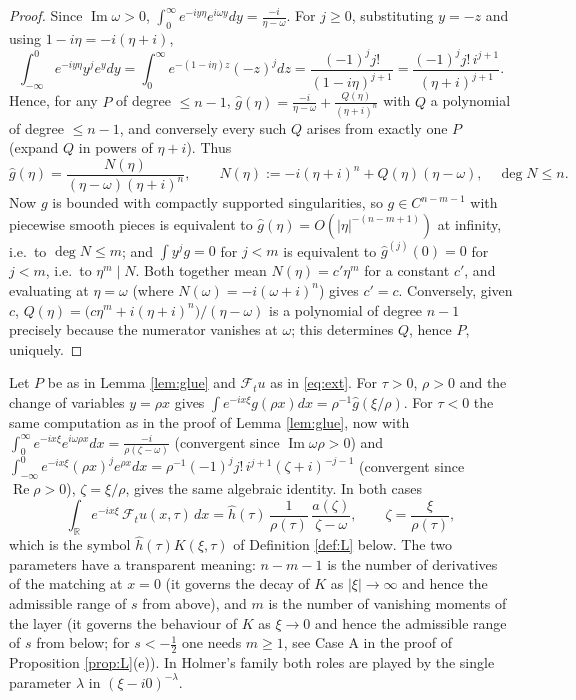\documentclass[10pt,reqno]{amsart}
\theoremstyle{remark}
\numberwithin{equation}{section}
\newcommand{\R}{\mathbb R}
\newcommand{\om}{\omega}
\newcommand{\la}{\lambda}
\newcommand{\re}{\operatorname{Re}}
\newcommand{\ima}{\operatorname{Im}}
\newcommand{\F}{\mathcal{F}}
\begin{document}
\begin{proof}
Since $\ima\om>0$, $\int_0^\infty e^{-iy\eta}e^{i\om y}dy=\frac{-i}{\eta-\om}$. For $j\ge0$, substituting $y=-z$ and using $1-i\eta=-i(\eta+i)$,
$$\int_{-\infty}^0e^{-iy\eta}y^je^{y}dy=\int_0^\infty e^{-(1-i\eta)z}(-z)^jdz=\frac{(-1)^jj!}{(1-i\eta)^{j+1}}=\frac{(-1)^jj!\,i^{j+1}}{(\eta+i)^{j+1}} .$$
Hence, for any $P$ of degree $\le n-1$, $\widehat g(\eta)=\frac{-i}{\eta-\om}+\frac{Q(\eta)}{(\eta+i)^n}$ with $Q$ a polynomial of degree $\le n-1$, and conversely every such $Q$ arises from exactly one $P$ (expand $Q$ in powers of $\eta+i$). Thus
$$\widehat g(\eta)=\frac{N(\eta)}{(\eta-\om)(\eta+i)^n},\qquad N(\eta):=-i(\eta+i)^n+Q(\eta)(\eta-\om),\quad \deg N\le n .$$
Now $g$ is bounded with compactly supported singularities, so $g\in C^{n-m-1}$ with piecewise smooth pieces is equivalent to $\widehat g(\eta)=O(|\eta|^{-(n-m+1)})$ at infinity, i.e.\ to $\deg N\le m$; and $\int y^jg=0$ for $j<m$ is equivalent to $\widehat g^{(j)}(0)=0$ for $j<m$, i.e.\ to $\eta^m\mid N$. Both together mean $N(\eta)=c'\eta^m$ for a constant $c'$, and evaluating at $\eta=\om$ (where $N(\om)=-i(\om+i)^n$) gives $c'=c$. Conversely, given $c$, $Q(\eta)=\big(c\eta^m+i(\eta+i)^n\big)/(\eta-\om)$ is a polynomial of degree $n-1$ precisely because the numerator vanishes at $\om$; this determines $Q$, hence $P$, uniquely.
\end{proof}

 Let $P$ be as in Lemma \ref{lem:glue} and $\F_tu$ as in \eqref{eq:ext}. For $\tau>0$, $\rho>0$ and the change of variables $y=\rho x$ gives $\int e^{-ix\xi}g(\rho x)dx=\rho^{-1}\widehat g(\xi/\rho)$. For $\tau<0$ the same computation as in the proof of Lemma \ref{lem:glue}, now with $\int_0^\infty e^{-ix\xi}e^{i\om\rho x}dx=\frac{-i}{\rho(\zeta-\om)}$ (convergent since $\ima\om\rho>0$) and $\int_{-\infty}^0e^{-ix\xi}(\rho x)^je^{\rho x}dx=\rho^{-1}(-1)^jj!\,i^{j+1}(\zeta+i)^{-j-1}$ (convergent since $\re\rho>0$), $\zeta=\xi/\rho$, gives the same algebraic identity. In both cases
\begin{equation}\label{eq:symbol-derived}
\int_\R e^{-ix\xi}\,\F_tu(x,\tau)\,dx=\widehat h(\tau)\,\frac{1}{\rho(\tau)}\,\frac{a(\zeta)}{\zeta-\om},\qquad \zeta=\frac{\xi}{\rho(\tau)} ,
\end{equation}
which is the symbol $\widehat h(\tau)K(\xi,\tau)$ of Definition \ref{def:L} below. The two parameters have a transparent meaning: $n-m-1$ is the number of derivatives of the matching at $x=0$ (it governs the decay of $K$ as $|\xi|\to\infty$ and hence the admissible range of $s$ from above), and $m$ is the number of vanishing moments of the layer (it governs the behaviour of $K$ as $\xi\to0$ and hence the admissible range of $s$ from below; for $s<-\frac12$ one needs $m\ge1$, see Case A in the proof of Proposition \ref{prop:L}(e)). In Holmer's family both roles are played by the single parameter $\la$ in $(\xi-i0)^{-\la}$.
\end{document}
